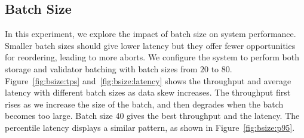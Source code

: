 \subsection{Batch Size}
In this experiment, we explore the impact of batch size on system performance. 
Smaller batch sizes should give lower latency but they offer fewer opportunities for reordering, leading to more aborts. 
We configure the system to perform both storage and validator batching with batch sizes from $20$ to $80$.
Figure~\ref{fig:bsize:tps} and~\ref{fig:bsize:latency} shows the throughput and average latency with different batch sizes as data skew increases. The throughput first rises as we increase the size of the batch, and then degrades when the batch becomes too large. Batch size 40 gives the best throughput and the latency. The percentile latency displays a similar pattern, as shown in Figure~\ref{fig:bsize:p95}.

